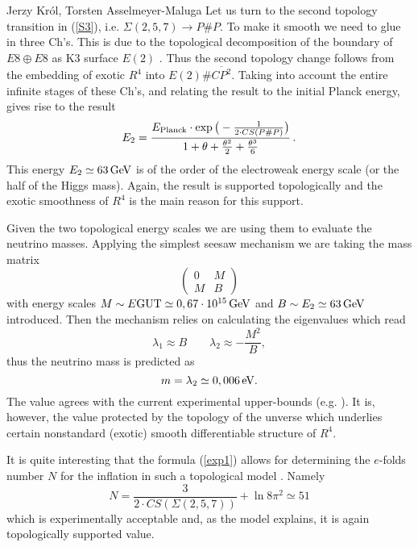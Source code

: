 \begin{artengenv2auth}{Jerzy Kr\'ol, Torsten Asselmeyer-Maluga}
Let us turn to the second topology transition in (\ref{S3}), i.e. $\Sigma(2,5,7)\to P\#P$. To make it smooth we need to glue in three Ch's. This is due to the topological decomposition of the boundary of $E8\oplus E8$ as K3 surface $E(2)$ \parencite{AK2018,AK2019}. Thus the second topology change follows from the embedding of exotic $R^4$ into $E(2)\# \overline{CP^2}$. Taking into account the entire infinite stages of these Ch's, and relating the result to the initial Planck energy, gives rise to the result 
\[E_2=\frac{E_{\rm Planck}\cdot \exp\big(-\frac{1}{2\cdot CS(P\# P)}\big)}{1+\theta +\frac{\theta^2}{2}+\frac{\theta^3}{6}}\,. \]
This energy $E_2\simeq 63\, {\rm GeV}$ is of the order of the electroweak energy scale (or the half of the Higgs mass). Again, the result is supported topologically and the exotic smoothness of $R^4$ is the main reason for this support. 

Given the two topological energy scales we are using them to evaluate the neutrino masses. Applying the simplest seesaw mechanism we are taking the mass matrix 
\[
\left(\begin{array}{cc}
0 & M\\
M & B
\end{array}\right)
\] with energy scales $M\sim {E\rm GUT}\simeq 0,67\cdot 10^{15}\, {\rm GeV}$ and $B\sim E_2\simeq 63\, {\rm GeV}$ introduced. Then the mechanism relies on calculating the eigenvalues which read \[
\lambda_{1}\approx B\qquad\lambda_{2}\approx-\frac{M^{2}}{B},
\] thus the neutrino mass is predicted as 
\[m=\lambda_2\simeq 0,006\, {\rm eV}.   \] The value agrees with the current experimental upper-bounds (e.g. \cite{PlanckCosmoParam2015,Neutrino2015}). It is, however, the value protected by the topology of the unverse which underlies certain nonstandard (exotic) smooth differentiable structure of $R^4$. 

It is quite interesting that the formula (\ref{exp1}) allows for determining the $e$-folds number $N$ for the inflation in such a topological model \parencite{AK2014,AK2019}. Namely
\[N=\frac{3}{2\cdot CS(\Sigma(2,5,7))} + \ln 8 \pi^2 \simeq 51 \] which is experimentally acceptable and, as the model explains, it is again topologically supported value.

\end{artengenv2auth}
